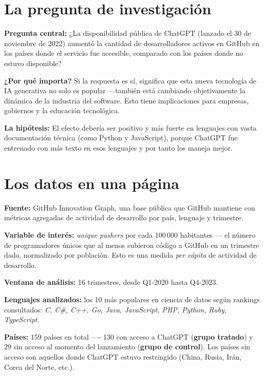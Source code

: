 \documentclass[11pt,a4paper]{article}
\begin{document}
\section{La pregunta de investigación}

\textbf{Pregunta central:} ¿La disponibilidad pública de ChatGPT (lanzado el 30 de noviembre de 2022) aumentó la cantidad de desarrolladores activos en GitHub en los países donde el servicio fue accesible, comparado con los países donde no estuvo disponible?

\textbf{¿Por qué importa?} Si la respuesta es sí, significa que esta nueva tecnología de IA generativa no solo es popular —también está cambiando objetivamente la dinámica de la industria del software. Esto tiene implicaciones para empresas, gobiernos y la educación tecnológica.

\textbf{La hipótesis:} El efecto debería ser positivo y más fuerte en lenguajes con vasta documentación técnica (como Python y JavaScript), porque ChatGPT fue entrenado con más texto en esos lenguajes y por tanto los maneja mejor.

\section{Los datos en una página}

\textbf{Fuente:} GitHub Innovation Graph, una base pública que GitHub mantiene con métricas agregadas de actividad de desarrollo por país, lenguaje y trimestre.

\textbf{Variable de interés:} \textit{unique pushers} por cada 100\,000 habitantes — el número de programadores únicos que al menos subieron código a GitHub en un trimestre dado, normalizado por población. Esto es una medida \textit{per cápita} de actividad de desarrollo.

\textbf{Ventana de análisis:} 16 trimestres, desde Q1-2020 hasta Q4-2023.

\textbf{Lenguajes analizados:} los 10 más populares en ciencia de datos según rankings consultados: \textit{C, C\#, C++, Go, Java, JavaScript, PHP, Python, Ruby, TypeScript}.

\textbf{Países:} 159 países en total ---- 130 con acceso a ChatGPT (\textbf{grupo tratado}) y 29 sin acceso al momento del lanzamiento (\textbf{grupo de control}). Los países sin acceso son aquellos donde ChatGPT estuvo restringido (China, Rusia, Irán, Corea del Norte, etc.).
\end{document}
